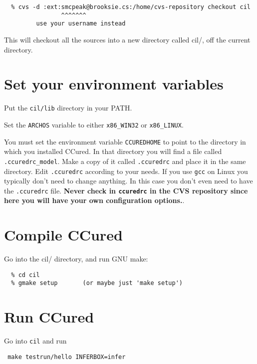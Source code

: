 \documentclass{book}
\def\t#1{{\tt #1}}
\begin{document}
\begin{verbatim}
  % cvs -d :ext:smcpeak@brooksie.cs:/home/cvs-repository checkout cil
                ^^^^^^^
         use your username instead
\end{verbatim}

This will checkout all the sources into a new directory called cil/, off
the current directory.


\section{Set your environment variables}

 Put the \t{cil/lib} directory in your PATH.

 Set the \t{ARCHOS} variable to either \t{x86\_WIN32} or \t{x86\_LINUX}.

 You must set the environment variable \t{CCUREDHOME} to point to the
directory in which you installed CCured. In that directory you will find a
file called \t{.ccuredrc\_model}. Make a copy of it called \t{.ccuredrc} and
place it in the same directory. Edit \t{.ccuredrc} according to your needs. If
you use \t{gcc} on Linux you typically don't need to change anything. In this
case you don't even need to have the \t{.ccuredrc} file. {\bf Never check in
\t{ccuredrc} in the CVS repository since here you will have your own
configuration options.}.

\section{Compile CCured}

Go into the cil/ directory, and run GNU make:

\begin{verbatim}
  % cd cil
  % gmake setup       (or maybe just 'make setup')
\end{verbatim}

\section{Run CCured}

Go into \t{cil} and run
\begin{verbatim}
 make testrun/hello INFERBOX=infer
\end{verbatim}


\appendix
\end{document}
